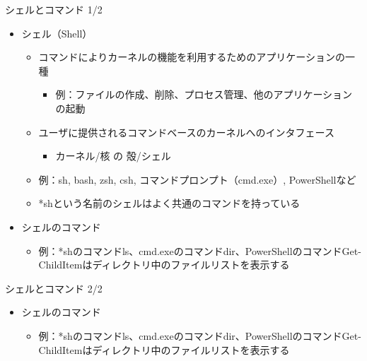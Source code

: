 \documentclass[12pt,aspectratio=169]{beamer}
\begin{document}
\begin{frame}{シェルとコマンド 1/2}
  \begin{itemize}
    \item シェル（Shell）
      \begin{itemize}
        \item コマンドによりカーネルの機能を利用するためのアプリケーションの一種
          \begin{itemize}
            \item 例：ファイルの作成、削除、プロセス管理、他のアプリケーションの起動
          \end{itemize}
        \item ユーザに提供されるコマンドベースのカーネルへのインタフェース
          \begin{itemize}
            \item カーネル/核 の 殻/シェル
          \end{itemize}
        \item 例：sh, bash, zsh, csh, コマンドプロンプト（cmd.exe）, PowerShellなど
        \item *shという名前のシェルはよく共通のコマンドを持っている
      \end{itemize}
    \item シェルのコマンド
      \begin{itemize}
        \item 例：*shのコマンドls、cmd.exeのコマンドdir、PowerShellのコマンドGet-ChildItemはディレクトリ中のファイルリストを表示する
      \end{itemize}
  \end{itemize}

\end{frame}


\begin{frame}{シェルとコマンド 2/2}
  \begin{itemize}
    \item シェルのコマンド
      \begin{itemize}
        \item 例：*shのコマンドls、cmd.exeのコマンドdir、PowerShellのコマンドGet-ChildItemはディレクトリ中のファイルリストを表示する
      \end{itemize}
  \end{itemize}


\end{frame}
\end{document}
